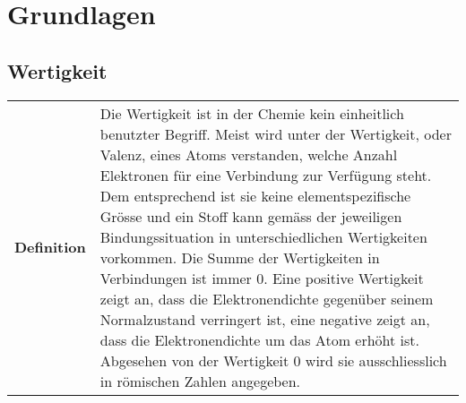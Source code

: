 \section{Grundlagen}

\subsection{Wertigkeit}
\begin{longtable}{p{3cm}p{14cm}}
	\textbf{Definition}
		& Die Wertigkeit ist in der Chemie kein einheitlich benutzter Begriff. Meist wird unter der Wertigkeit, oder Valenz, eines Atoms verstanden, welche Anzahl Elektronen für eine Verbindung zur Verfügung steht. Dem entsprechend ist sie keine elementspezifische Grösse und ein Stoff kann gemäss der jeweiligen Bindungssituation in unterschiedlichen Wertigkeiten vorkommen. Die Summe der Wertigkeiten in Verbindungen ist immer 0. Eine positive Wertigkeit zeigt an, dass die Elektronendichte gegenüber seinem Normalzustand verringert ist, eine negative zeigt an, dass die Elektronendichte um das Atom erhöht ist. Abgesehen von der Wertigkeit 0 wird sie ausschliesslich in römischen Zahlen angegeben.\\
\end{longtable}


